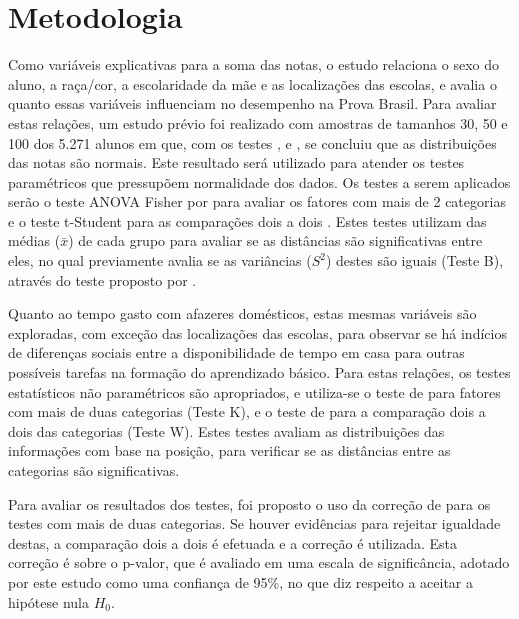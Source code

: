 

\chapter{Metodologia}
Como variáveis explicativas para a soma das notas, o estudo relaciona o sexo do aluno, a raça/cor, a escolaridade da mãe e as localizações das escolas,
e avalia o quanto essas variáveis influenciam no desempenho na Prova Brasil. Para avaliar estas relações, um estudo prévio foi realizado
com amostras de tamanhos 30, 50 e 100 dos 5.271 alunos em que, com os testes , 
e , se concluiu que as distribuições das notas são normais. Este resultado será utilizado para atender
os testes paramétricos que pressupõem normalidade dos dados. Os testes a serem aplicados serão o teste ANOVA Fisher por  para 
avaliar os fatores com mais de 2 categorias e o teste t-Student para as comparações dois a dois \cite{o1908student}.
Estes testes utilizam das médias ($\bar{x}$) de cada grupo para avaliar se as distâncias são significativas entre eles, no qual previamente avalia se as
variâncias ($S^2$) destes são iguais (Teste B), através do teste proposto por .

Quanto ao tempo gasto com afazeres domésticos, estas mesmas variáveis são exploradas, com exceção das localizações das escolas,
para observar se há indícios de diferenças sociais entre a disponibilidade de tempo em casa para outras possíveis 
tarefas na formação do aprendizado básico. Para estas relações, os testes estatísticos não paramétricos são apropriados,
e utiliza-se o teste de  para fatores com mais de duas categorias (Teste K), e o
teste de  para a comparação dois a dois das categorias (Teste W). Estes testes avaliam as
distribuições das informações com base na posição, para verificar se as distâncias entre as categorias são significativas.

Para avaliar os resultados dos testes, foi proposto o uso da correção de  para os 
testes com mais de duas categorias. Se houver evidências para rejeitar igualdade destas, a comparação dois a dois é
efetuada e a correção é utilizada. Esta correção é sobre o p-valor, que é avaliado em uma escala de significância,
adotado por este estudo como uma confiança de 95\%, no que diz respeito a aceitar a hipótese nula $H_0$.